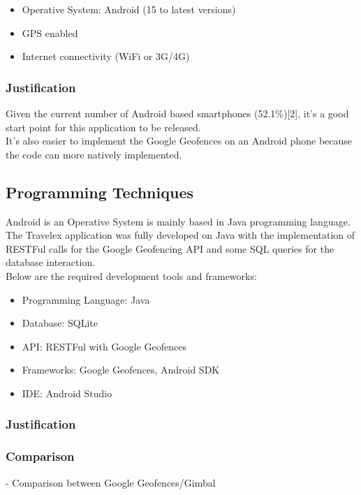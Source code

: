 \begin{itemize}
  \item Operative System: Android (15 to latest versions)
  \item GPS enabled  
  \item Internet connectivity (WiFi or 3G/4G)
\end{itemize}


\subsubsection{Justification}
Given the current number of Android based smartphones (52.1\%)[2], it's a good start point for this application to be 
released. \\
It's also easier to implement the Google Geofences on an Android phone because the code can more natively implemented.

\subsection{Programming Techniques}
Android is an Operative System is mainly based in Java programming language. The Travelex application was fully developed
on Java with the implementation of RESTFul calls for the Google Geofencing API and some SQL queries for the database
interaction. \\

Below are the required development tools and frameworks:

\begin{itemize}
  \item Programming Language: Java
  \item Database: SQLite
  \item API: RESTFul with Google Geofences
  \item Frameworks: Google Geofences, Android SDK
  \item IDE: Android Studio
\end{itemize}

\subsubsection{Justification}


\subsubsection{Comparison}
- Comparison between Google Geofences/Gimbal
